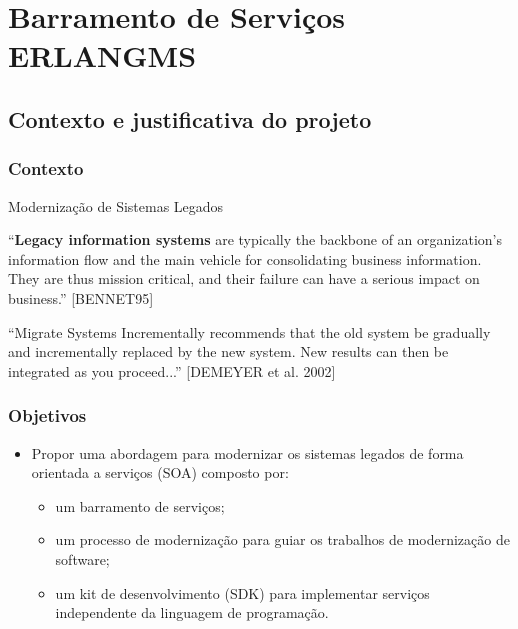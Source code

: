 \documentclass{beamer}
\begin{document}




\section{Barramento de Serviços ERLANGMS}


\subsection{Contexto e justificativa do projeto}


\begin{frame}
  \frametitle{Contexto}

  \begin{exampleblock}{Modernização de Sistemas Legados}
  
  “\textbf{Legacy information systems} are typically the
	backbone of an organization’s information flow
	and the main vehicle for consolidating business
	information. They are thus mission critical, and
	their failure can have a serious impact on
	business.” [BENNET95]

	\vspace{0.5cm} 

	“Migrate Systems Incrementally recommends that the old system be
	gradually and incrementally replaced by the new system. New
	results can then be integrated as you proceed...” [DEMEYER et al. 2002]
  \end{exampleblock}

  
\end{frame}







\begin{frame}
  \frametitle{Objetivos}
  
    \begin{itemize}
       \item<1-> Propor uma abordagem para modernizar os sistemas legados de
forma orientada a serviços (SOA) composto por:

    \begin{itemize}
       \item<1->um barramento de serviços;
       \item<1->um processo de modernização para guiar os trabalhos de modernização de software; 
       \item<1->um kit de desenvolvimento (SDK) para implementar serviços independente da
       linguagem de programação.
    \end{itemize}
				
    \end{itemize}
    
\end{frame}
\end{document}
